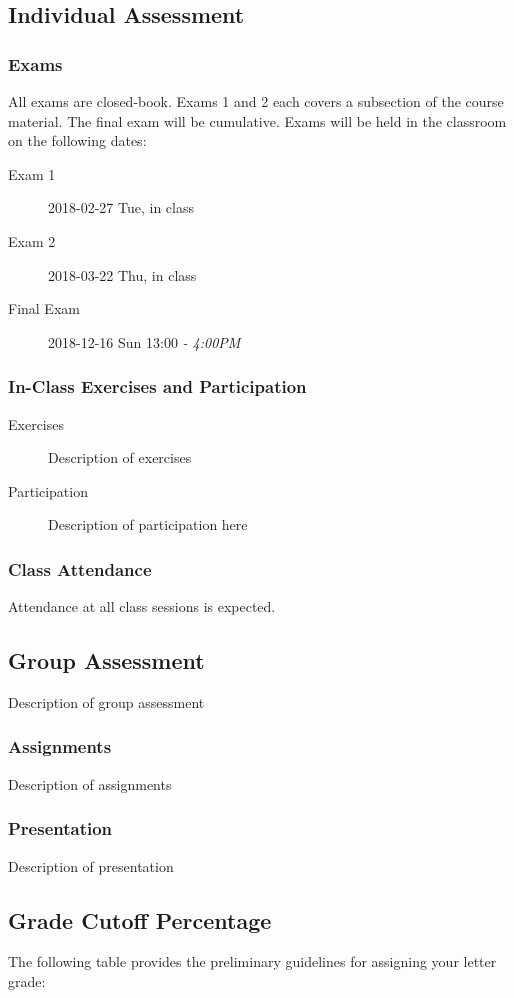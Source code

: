\documentclass[article,letterpaper,times,10pt,listings-bw,microtype]{scrartcl}
\begin{document}
\subsection*{Individual Assessment}
\label{sec:org40700ef}
\subsubsection*{Exams}
\label{sec:orgd3c08b4}
All exams are closed-book. Exams 1 and 2 each covers a subsection of the
course material. The final exam will be cumulative. Exams will be held in the
classroom on the following dates:

\begin{description}
\item[{Exam 1}] 2018-02-27 Tue, in class
\item[{Exam 2}] 2018-03-22 Thu, in class
\item[{Final Exam}] 2018-12-16 Sun 13:00  \emph{- 4:00PM}
\end{description}
\subsubsection*{In-Class Exercises and Participation}
\label{sec:org9a9e7e5}
\begin{description}
\item[{Exercises}] Description of exercises

\item[{Participation}] Description of participation here
\end{description}
\subsubsection*{Class Attendance}
\label{sec:org6c0122a}
Attendance at all class sessions is expected.
\subsection*{Group Assessment}
\label{sec:org1109764}
Description of group assessment
\subsubsection*{Assignments}
\label{sec:org368744f}
Description of assignments
\subsubsection*{Presentation}
\label{sec:orgaebbae4}
Description of presentation
\subsection*{Grade Cutoff Percentage}
\label{sec:org094b9d2}
The following table provides the preliminary guidelines for assigning your
letter grade:
\end{document}
